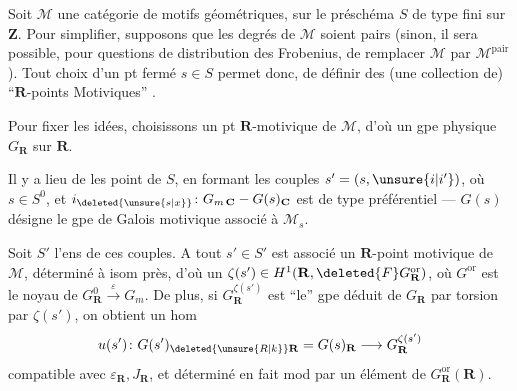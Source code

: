Soit $\mathcal M$ une catégorie de motifs géométriques,  sur le préschéma $S$ de type fini sur $\mathbf Z$. Pour simplifier, supposons que les degrés de $\mathcal M$ soient pairs (sinon, il sera possible, pour   questions de distribution des Frobenius, de remplacer $\mathcal M$ par $\mathcal M^{\mathrm{pair}}$). Tout choix d'un pt fermé $s\in S$ permet donc, de définir des (une collection de) ``$\mathbf R$-points Motiviques''  .

Pour fixer les idées, choisissons un pt $\mathbf R$-motivique de $\mathcal M$, d'où un gpe physique $G_{\mathbf R}$ sur $\mathbf R$.

Il y a lieu de   les point  de $S$, en formant les couples $s'=(s,\unsure{i|i'})$, où $s\in S^0$, et
$i_{\deleted{\unsure{s|x}}}\colon G_{m\,\mathbf C}-G(s)_{\mathbf C}$ est de type  préférentiel --- $G(s)$ désigne le gpe de Galois motivique associé à $\mathcal M_s$.

 Soit $S'$ l'ens de ces couples. A tout $s'\in S'$ est associé un $\mathbf R$-point motivique de $\mathcal M$,  déterminé à isom près, d'où un $\zeta(s')\in H^1(\mathbf R,\deleted{F}G_{\mathbf R}^{\mathrm{or}})$, où $G^{\mathrm{or}}$ est le noyau de $G_{\mathbf R}^0\xrightarrow{\varepsilon}G_m$. De plus, si $G_{\mathbf R}^{\zeta(s')}$ est ``le'' gpe déduit de $G_{\mathbf R}$ par torsion par $\zeta(s')$, on obtient un hom
\[
u(s')\colon G(s')_{\deleted{\unsure{R|k}}\mathbf R}=G(s)_{\mathbf R}\longrightarrow G_{\mathbf R}^{\zeta(s')}
\]
compatible avec $\varepsilon_{\mathbf R},J_{\mathbf R}$, et déterminé en fait mod    par un élément de $G_{\mathbf R}^{\mathrm{or}}(\mathbf R)$.

